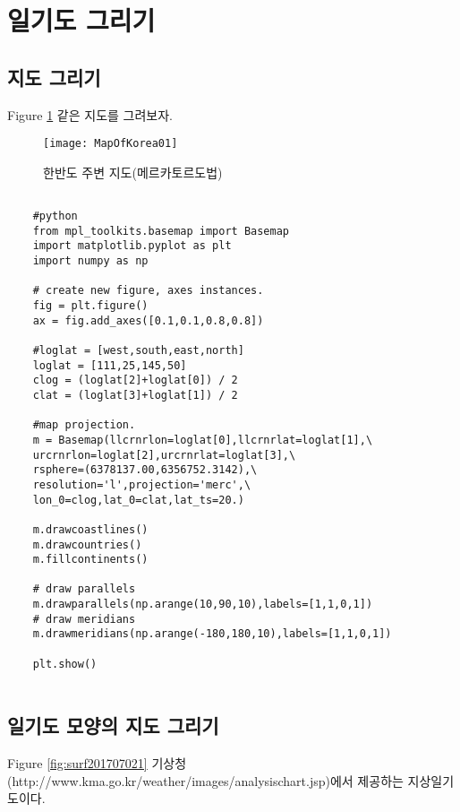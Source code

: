 
\section{일기도 그리기}

\subsection{지도 그리기}

Figure \ref{fig:mapofkorea01} \과 같은 지도를 그려보자.
\begin{figure}[h]
	\centering
	\texttt{[image: MapOfKorea01]}
	\caption{한반도 주변 지도(메르카토르도법)}
	\label{fig:mapofkorea01}
\end{figure}


\begin{code}
	\begin{lstlisting}
	
	#python 
	from mpl_toolkits.basemap import Basemap
	import matplotlib.pyplot as plt
	import numpy as np
	
	# create new figure, axes instances.
	fig = plt.figure()
	ax = fig.add_axes([0.1,0.1,0.8,0.8])
	
	#loglat = [west,south,east,north]
	loglat = [111,25,145,50]
	clog = (loglat[2]+loglat[0]) / 2
	clat = (loglat[3]+loglat[1]) / 2
	
	#map projection.
	m = Basemap(llcrnrlon=loglat[0],llcrnrlat=loglat[1],\
	urcrnrlon=loglat[2],urcrnrlat=loglat[3],\
	rsphere=(6378137.00,6356752.3142),\
	resolution='l',projection='merc',\
	lon_0=clog,lat_0=clat,lat_ts=20.)
	
	m.drawcoastlines()
	m.drawcountries()
	m.fillcontinents()
	
	# draw parallels
	m.drawparallels(np.arange(10,90,10),labels=[1,1,0,1])
	# draw meridians
	m.drawmeridians(np.arange(-180,180,10),labels=[1,1,0,1])
	
	plt.show()
	
	\end{lstlisting}
\end{code}

\subsection{일기도 모양의 지도 그리기}

Figure \ref{fig:surf201707021} \은 기상청(http://www.kma.go.kr/weather/images/analysischart.jsp)에서 제공하는 지상일기도이다. 

